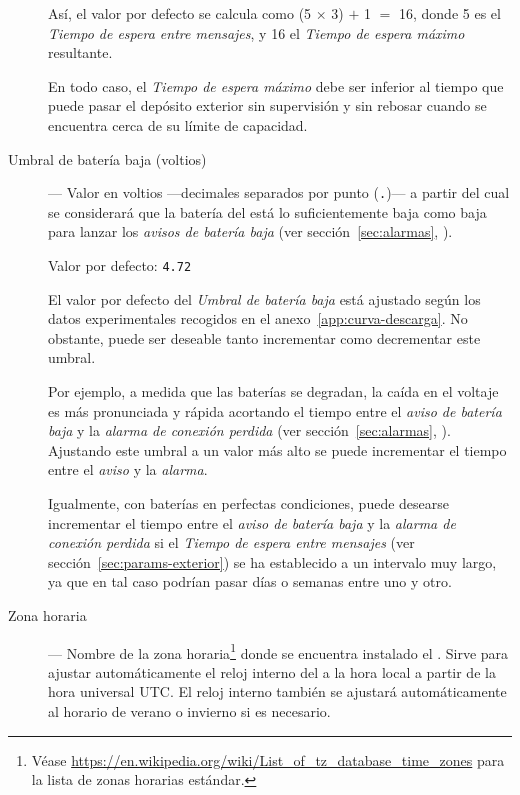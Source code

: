 \begin{description}
  Así, el valor por defecto se calcula como (5 $\times$ 3) $+$ 1 $=$ 16, donde 5 es el \emph{Tiempo de espera entre mensajes}, y 16 el \emph{Tiempo de espera máximo} resultante.
  
  En todo caso, el \emph{Tiempo de espera máximo} debe ser inferior al tiempo que puede pasar el depósito exterior sin supervisión y sin rebosar cuando se encuentra cerca de su límite de capacidad.
  \tipend
  
  
  \item[Umbral de batería baja (voltios)] --- Valor en voltios ---decimales separados por punto (\texttt{.})--- a partir del cual se considerará que la batería del \MEE está lo suficientemente baja como baja para lanzar los \emph{avisos de batería baja}  (ver sección~\ref{sec:alarmas}, \textit{}).
  
  Valor por defecto: \texttt{4.72}
  
  El valor por defecto del \emph{Umbral de batería baja} está ajustado según los datos experimentales recogidos en el anexo~\ref{app:curva-descarga}. No obstante, puede ser deseable tanto incrementar como decrementar este umbral.
  
  Por ejemplo, a medida que las baterías se degradan, la caída en el voltaje es más pronunciada y rápida acortando el tiempo entre el \emph{aviso de batería baja} y la \emph{alarma de conexión perdida} (ver sección~\ref{sec:alarmas}, \textit{}). Ajustando este umbral a un valor más alto se puede incrementar el tiempo entre el \emph{aviso} y la \emph{alarma}.
  
  Igualmente, con baterías en perfectas condiciones, puede desearse incrementar el tiempo entre el \emph{aviso de batería baja} y la \emph{alarma de conexión perdida} si el \emph{Tiempo de espera entre mensajes} (ver sección~\ref{sec:params-exterior}) se ha establecido a un intervalo muy largo, ya que en tal caso podrían pasar días o semanas entre uno y otro.
  \tipend
  
  \item[Zona horaria] --- Nombre de la zona horaria\footnote{Véase \url{https://en.wikipedia.org/wiki/List_of_tz_database_time_zones} para la lista de zonas horarias estándar.} donde se encuentra instalado el \CMS. Sirve para ajustar automáticamente el reloj interno del \MEE a la hora local a partir de la hora universal UTC. El reloj interno también se ajustará automáticamente al horario de verano o invierno si es necesario.
  

\end{description}
